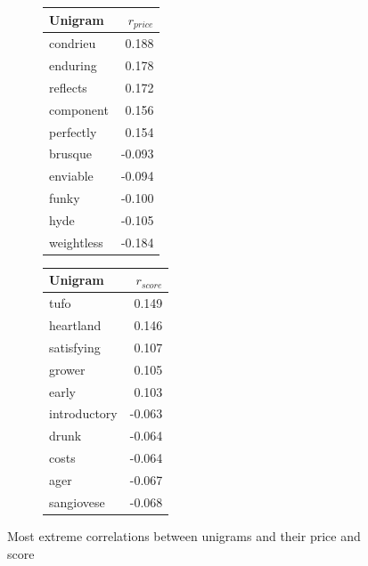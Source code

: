 \documentclass[10pt]{IEEEtran}
\begin{document}
    \begin{figure}
    \centering
    \begin{subfigure}[t]{0.4\columnwidth}
    \begin{tabular}{ |l|r| }
        \hline
        Unigram & $r_{price}$ \\
        \hline
        \hline
        condrieu & 0.188 \\
	    enduring & 0.178 \\ 
	    reflects & 0.172 \\
	    component & 0.156 \\
	    perfectly & 0.154 \\
        \hline
        brusque & -0.093 \\
        enviable & -0.094 \\
        funky & -0.100 \\
        hyde & -0.105 \\
        weightless & -0.184 \\
        \hline
    \end{tabular}
    \end{subfigure}
    \begin{subfigure}[t]{0.4\columnwidth}
    \begin{tabular}{ |l|r| }
        \hline
        Unigram & $r_{score}$ \\
        \hline
        \hline
        tufo & 0.149 \\
        heartland & 0.146 \\
        satisfying & 0.107 \\
        grower & 0.105 \\
        early & 0.103 \\
        \hline
        introductory & -0.063 \\
        drunk & -0.064 \\
        costs & -0.064 \\
        ager & -0.067 \\
        sangiovese & -0.068 \\
        \hline
    \end{tabular}
    \end{subfigure}
    \caption{Most extreme correlations between unigrams and their price and score}
    \label{correlations}
    \end{figure}

    
\end{document}
